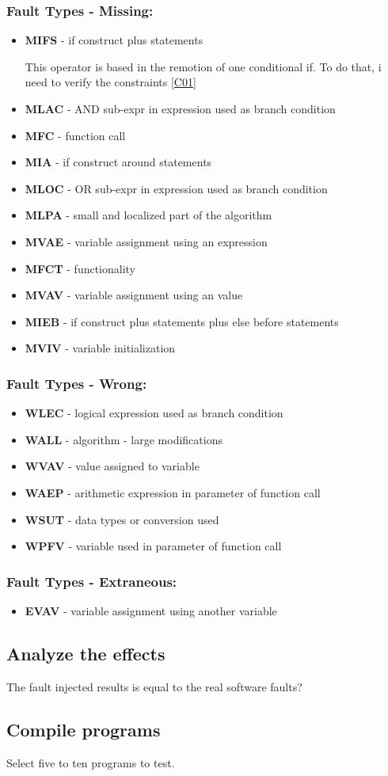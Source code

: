 \subsubsection{Fault Types - Missing:}
\begin{itemize}
	\item \textbf{MIFS} - if construct plus statements

	This operator is based in the remotion of one conditional if. To do that, i need to verify the constraints \ref{C01}
	\item \textbf{MLAC} - AND sub-expr in expression used as branch condition
	\item \textbf{MFC}  - function call
	\item \textbf{MIA}  - if construct around statements
	\item \textbf{MLOC} - OR sub-expr in expression used as branch condition
	\item \textbf{MLPA} - small and localized part of the algorithm
	\item \textbf{MVAE} - variable assignment using an expression
	\item \textbf{MFCT} - functionality
	\item \textbf{MVAV} - variable assignment using an value
	\item \textbf{MIEB} - if construct plus statements plus else before statements
	\item \textbf{MVIV} - variable initialization
\end{itemize}

\subsubsection{Fault Types - Wrong:}
\begin{itemize}
	\item \textbf{WLEC} - logical expression used as branch condition
	\item \textbf{WALL} - algorithm - large modifications
	\item \textbf{WVAV} - value assigned to variable
	\item \textbf{WAEP} - arithmetic expression in parameter of function call
	\item \textbf{WSUT} - data types or conversion used
	\item \textbf{WPFV} - variable used in parameter of function call
\end{itemize}

\subsubsection{Fault Types - Extraneous:}
\begin{itemize}
	\item \textbf{EVAV} - variable assignment using another variable
\end{itemize}


\subsection{Analyze the effects}

The fault injected results is equal to the real software faults?

\subsection{Compile programs}

Select five to ten programs to test.

